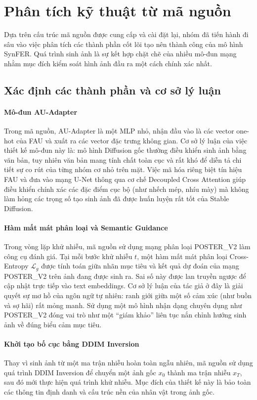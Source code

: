 \section{Phân tích kỹ thuật từ mã nguồn}

Dựa trên cấu trúc mã nguồn được cung cấp và cài đặt lại, nhóm đã tiến hành đi sâu vào việc phân tích các thành phần cốt lõi tạo nên thành công của mô hình SynFER. Quá trình sinh ảnh là sự kết hợp chặt chẽ của nhiều mô-đun mạng nhằm mục đích kiểm soát hình ảnh đầu ra một cách chính xác nhất.

\subsection{Xác định các thành phần và cơ sở lý luận}

\paragraph{Mô-đun AU-Adapter}
Trong mã nguồn, AU-Adapter là một MLP nhỏ, nhận đầu vào là các vector one-hot của FAU và xuất ra các vector đặc trưng không gian. Cơ sở lý luận của việc thiết kế mô-đun này là: mô hình Diffusion gốc thường điều khiển sinh ảnh bằng văn bản, tuy nhiên văn bản mang tính chất toàn cục và rất khó để diễn tả chi tiết sự co rút của từng nhóm cơ nhỏ trên mặt. Việc mã hóa riêng biệt tín hiệu FAU và đưa vào mạng U-Net thông qua cơ chế Decoupled Cross Attention giúp điều khiển chính xác các đặc điểm cục bộ (như nhếch mép, nhíu mày) mà không làm hỏng các trọng số tạo sinh ảnh đã được huấn luyện rất tốt của Stable Diffusion.

\paragraph{Hàm mất mát phân loại và Semantic Guidance}
Trong vòng lặp khử nhiễu, mã nguồn sử dụng mạng phân loại POSTER\_V2 làm công cụ đánh giá. Tại mỗi bước khử nhiễu $t$, một hàm mất mát phân loại Cross-Entropy $\mathcal{L}_g$ được tính toán giữa nhãn mục tiêu và kết quả dự đoán của mạng POSTER\_V2 trên ảnh đang được sinh ra. Sai số này được lan truyền ngược để cập nhật trực tiếp vào text embeddings. Cơ sở lý luận của tác giả ở đây là giải quyết sự mơ hồ của ngôn ngữ tự nhiên: ranh giới giữa một số cảm xúc (như buồn và sợ hãi) rất mỏng manh. Sử dụng một mô hình nhận dạng chuyên dụng như POSTER\_V2 đóng vai trò như một ``giám khảo'' liên tục nắn chỉnh hướng sinh ảnh về đúng biểu cảm mục tiêu.

\paragraph{Khởi tạo bố cục bằng DDIM Inversion}
Thay vì sinh ảnh từ một ma trận nhiễu hoàn toàn ngẫu nhiên, mã nguồn sử dụng quá trình DDIM Inversion để chuyển một ảnh gốc $x_0$ thành ma trận nhiễu $x_T$, sau đó mới thực hiện quá trình khử nhiễu. Mục đích của thiết kế này là bảo toàn các thông tin định danh và cấu trúc nền của nhân vật trong ảnh gốc.

